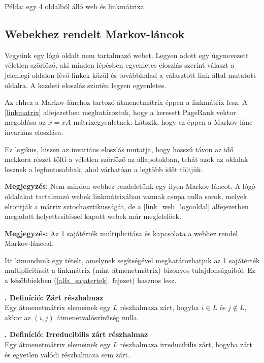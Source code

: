 \documentclass[12pt,a4paper]{article}
\newcounter{definicioszam}
\newenvironment{definicio}[1]
{{\medskip}\noindent \stepcounter{definicioszam}
{\bfseries{\thedefinicioszam. Definíció: #1\\[1ex]}}}{\bigskip }
\begin{document}
\bigskip
\centerline{Példa: egy 4 oldalból álló web és linkmátrixa}
\bigskip

\subsection{Webekhez rendelt Markov-láncok}\label{markov_lancok}

Vegyünk egy lógó oldalt nem tartalmazó webet. Legyen adott egy úgynevezett véletlen szörföző, aki minden lépésben egyenletes eloszlás szerint választ a jelenlegi oldalon lévő linkek közül és továbbhalad a választott link által mutatott oldalra. A kezdeti eloszlás szintén legyen egyenletes.

Az ehhez a Markov-lánchoz tartozó átmenetmátrix éppen a linkmátrix lesz. A \ref{linkmatrix} alfejezetben meghatároztuk, hogy a keresett PageRank vektor megoldása az $\bar{x} = \bar{x}A$ mátrixegyenletnek. Látszik, hogy ez éppen a Markov-lánc invariáns eloszlása.

Ez logikus, hiszen az invariáns eloszlás mutatja, hogy hosszú távon az idő mekkora részét tölti a véletlen szörföző az állapotokban, tehát azok az oldalak lesznek a legfontosabbak, ahol várhatóan a legtöbb időt töltjük.

\vspace{0.1cm}
\textbf{Megjegyzés:} Nem minden webhez rendeletünk egy ilyen Markov-láncot. A lógó oldalakat tartalmazó webek linkmátrixában vannak csupa nulla sorok, melyek elrontják a mátrix sztochasztikusságát, de a \ref{link_web_logooldal} alfejezetben megadott helyettesítéssel kapott webek már megfelelőek. 
\vspace{0.1cm}

\vspace{0.1cm}
\textbf{Megjegyzés:} Az 1 sajátérték multiplicitása és kapcsolata a webhez rendel Markov-lánccal.
\vspace{0.1cm}

Itt kimondunk egy tételt, amelynek segítségével meghatározhatjuk az 1 sajátérték multiplicitását a linkmátrix (mint átmenetmátrix) bizonyos tulajdonságaiból. Ez a későbbiekben (\ref{alfa_sajatertek}. fejezet) hasznos lesz. 

\begin{definicio}{Zárt részhalmaz}
	Egy átmenetmátrix elemeinek egy $L$ részhalmaza zárt, hogyha $i \in L$ és $j \notin L$, akkor az $(i,j)$ átmenetvalószínűség nulla.  
\end{definicio}

\begin{definicio}{Irreducibilis zárt részhalmaz}
	Egy átmenetmátrix elemeinek egy $L$ részhalmaza irreducibilis zárt, hogyha zárt és egyetlen valódi részhalmaza sem zárt.
\end{definicio}
\end{document}
